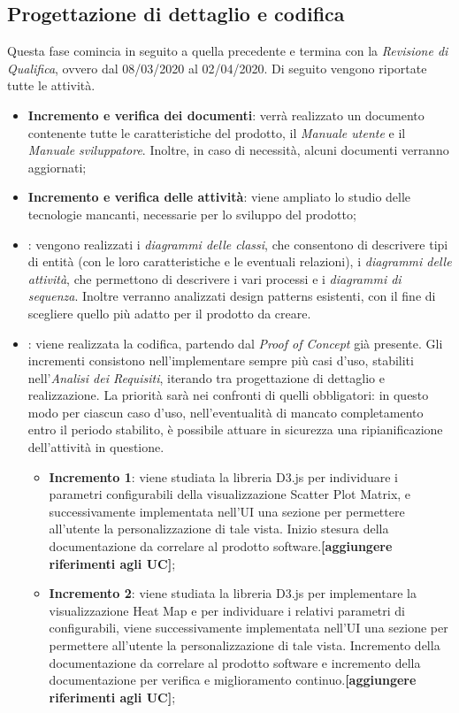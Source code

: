 \subsection{Progettazione di dettaglio e codifica}
Questa fase comincia in seguito a quella precedente e termina con la \textit{Revisione di Qualifica}, ovvero dal 08/03/2020 al 02/04/2020. Di seguito vengono riportate tutte le attività.

\begin{itemize}
	\item \textbf{Incremento e verifica dei documenti}: verrà realizzato un documento contenente tutte le caratteristiche del prodotto, il \textit{Manuale utente} e il \textit{Manuale sviluppatore}. Inoltre, in caso di necessità, alcuni documenti verranno aggiornati;
	\item \textbf{Incremento e verifica delle attività}: viene ampliato lo studio delle tecnologie mancanti, necessarie per lo sviluppo del prodotto; 
	\item \textbf{}: vengono realizzati i \textit{diagrammi delle classi}, che consentono di descrivere tipi di entità (con le loro caratteristiche e le eventuali relazioni), i \textit{diagrammi delle attività}, che permettono di descrivere i vari processi e i \textit{diagrammi di sequenza}. Inoltre verranno analizzati design patterns esistenti, con il fine di scegliere quello più adatto per il prodotto da creare.
	\item \textbf{}: viene realizzata la codifica, partendo dal \textit{Proof of Concept} già presente. Gli incrementi consistono nell'implementare sempre più casi d'uso, stabiliti nell'\textit{Analisi dei Requisiti}, iterando tra progettazione di dettaglio e realizzazione. La priorità sarà nei confronti di quelli obbligatori: in questo modo per ciascun caso d'uso, nell'eventualità di mancato completamento entro il periodo stabilito, è possibile attuare in sicurezza una ripianificazione dell'attività in questione.
	\begin{itemize}
	\item \textbf{Incremento 1}: viene studiata la libreria D3.js per individuare i parametri configurabili della visualizzazione Scatter Plot Matrix, e successivamente implementata nell'UI una sezione per permettere all'utente la personalizzazione di tale vista. Inizio stesura della documentazione da correlare al prodotto software.\textbf{[aggiungere riferimenti agli UC]};
	
	\item \textbf{Incremento 2}: viene studiata la libreria D3.js per implementare la visualizzazione Heat Map e per individuare i relativi parametri di configurabili, viene successivamente implementata nell'UI una sezione per permettere all'utente la personalizzazione di tale vista. Incremento della documentazione da correlare al prodotto software e incremento della documentazione per verifica e miglioramento continuo.\textbf{[aggiungere riferimenti agli UC]};
	

\end{itemize}
\end{itemize}
